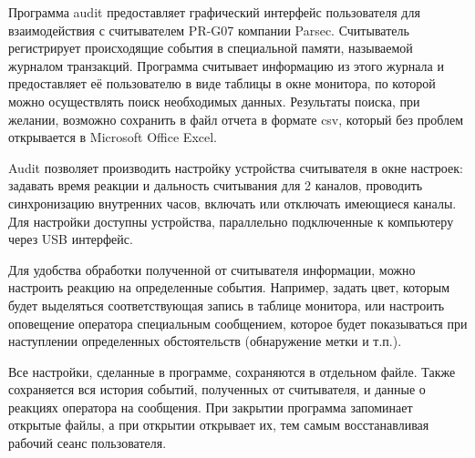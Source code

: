 ﻿Программа audit предоставляет графический интерфейс пользователя для взаимодействия с считывателем 
PR-G07 компании Parsec. Считыватель регистрирует происходящие события в специальной памяти,
называемой журналом транзакций. Программа считывает информацию из этого журнала и предоставляет её 
пользователю в виде таблицы в окне монитора, по которой можно осуществлять поиск необходимых данных. Результаты поиска,
при желании, возможно сохранить в файл отчета в формате csv, который без проблем открывается в Microsoft 
Office Excel.

Audit позволяет производить настройку устройства считывателя в окне настроек: задавать время реакции и дальность считывания
для 2 каналов, проводить синхронизацию внутренних часов, включать или отключать имеющиеся каналы.
Для настройки доступны устройства, параллельно подключенные к компьютеру через USB интерфейс. 

Для удобства обработки полученной от считывателя информации, можно настроить реакцию на определенные 
события. Например, задать цвет, которым будет выделяться соответствующая запись в таблице монитора, или 
настроить оповещение оператора специальным сообщением, которое будет показываться при наступлении
определенных обстоятельств (обнаружение метки и т.п.). 

Все настройки, сделанные в программе, сохраняются в отдельном файле. Также сохраняется вся история 
событий, полученных от считывателя, и данные о реакциях оператора на сообщения. При закрытии программа
запоминает открытые файлы, а при открытии открывает их, тем самым восстанавливая рабочий сеанс пользователя.